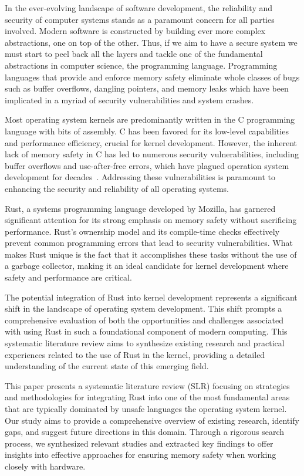 \documentclass[sigconf]{acmart}
\begin{document}
In the ever-evolving landscape of software development, the reliability and security of computer
systems stands as a paramount concern for all parties involved. Modern software is constructed by
building ever more complex abstractions, one on top of the other. Thus, if we aim to have a secure
system we must start to peel back all the layers and tackle one of the fundamental abstractions in
computer science, the programming language. Programming languages that provide and enforce memory
safety eliminate whole classes of bugs such as buffer overflows, dangling pointers, and memory leaks
which have been implicated in a myriad of security vulnerabilities and system crashes.

Most operating system kernels are predominantly written in the C programming language with bits of
assembly. C has been favored for its low-level capabilities and performance efficiency, crucial for
kernel development. However, the inherent lack of memory safety in C has led to numerous security
vulnerabilities, including buffer overflows and use-after-free errors, which have plagued operation
system development for decades~\cite{noauthor_undated-bf}. Addressing these vulnerabilities is
paramount to enhancing the security and reliability of all operating systems.

Rust, a systems programming language developed by Mozilla, has garnered significant attention for
its strong emphasis on memory safety without sacrificing performance. Rust's ownership model and its
compile-time checks effectively prevent common programming errors that lead to security
vulnerabilities. What makes Rust unique is the fact that it accomplishes these tasks without the use
of a garbage collector, making it an ideal candidate for kernel development where safety and
performance are critical.

The potential integration of Rust into kernel development represents a significant shift in the
landscape of operating system development. This shift prompts a comprehensive evaluation of both the
opportunities and challenges associated with using Rust in such a foundational component of modern
computing. This systematic literature review aims to synthesize existing research and practical
experiences related to the use of Rust in the kernel, providing a detailed understanding of
the current state of this emerging field.

This paper presents a systematic literature review (SLR) focusing on strategies and methodologies
for integrating Rust into one of the most fundamental areas that are typically dominated by unsafe
languages the operating system kernel. Our study aims to provide a comprehensive overview of
existing research, identify gaps, and suggest future directions in this domain. Through a rigorous
search process, we synthesized relevant studies and extracted key findings to offer insights into
effective approaches for ensuring memory safety when working closely with hardware.
\end{document}
